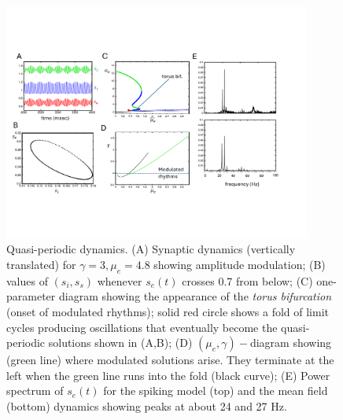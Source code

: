 \documentclass[10pt,letterpaper]{article}
\begin{document}
\begin{figure}
  \includegraphics[width=0.9\textwidth]{afig11.pdf}
  \caption{Quasi-periodic dynamics. (A) Synaptic dynamics (vertically translated) for $\gamma=3,\mu_e=4.8$ showing amplitude modulation; (B) values of $(s_i,s_s)$ whenever $s_e(t)$ crosses 0.7 from below; (C) one-parameter diagram showing the appearance of the {\em torus bifurcation} (onset of modulated rhythms); solid red circle shows a fold of limit cycles producing oscillations that eventually become the quasi-periodic solutions shown in (A,B); (D) $(\mu_e,\gamma)-$diagram showing (green line) where modulated solutions arise. They terminate at the left when the green line runs into the fold (black curve); (E) Power spectrum of $s_e(t)$ for the spiking model (top) and the mean field (bottom) dynamics showing peaks at about 24 and 27 Hz.}
  \label{fig:tor}
\end{figure}
\end{document}
